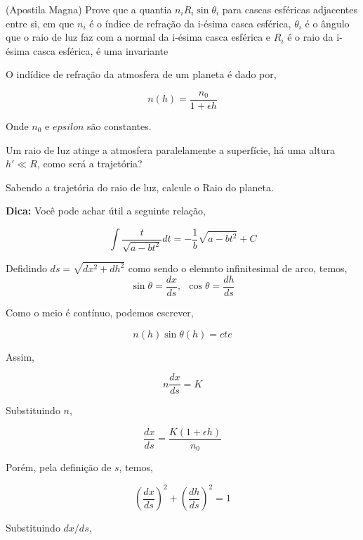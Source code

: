 \documentclass[11pt]{article}
\begin{document}
\begin{pproblem} (Apostila Magna)
    Prove que a quantia \(n_iR_i\sin \theta_i\) para cascas esféricas adjacentes entre si, em que \(n_i\) é o índice de refração da i-ésima casca esférica, \(\theta_i\) é o ângulo que o raio de luz faz com a normal da i-ésima casca esférica e \(R_i\) é o raio da i-ésima casca esférica, é uma invariante
    
\end{pproblem}

\begin{pproblem}
    O indídice de refração da atmosfera de um planeta é dado por, 

    \[n(h) = \frac{n_0}{1+\epsilon h}\]

    Onde \(n_0\) e \(epsilon\) são constantes.

    \begin{alternativas}
        \item Um raio de luz atinge a atmosfera paralelamente a superfície, há uma altura \(h'\ll R\), como será a trajetória?
        \item Sabendo a trajetória do raio de luz, calcule o Raio do planeta.
    
        \textbf{Dica:} Você pode achar útil a seguinte relação, 

        \[\int \frac{t}{\sqrt{a-bt^2}}dt = -\frac{1}{b}\sqrt{a-bt^2}+C\]
    \end{alternativas}
\begin{pssolution*}{}{}
    \begin{alternativas}
        \item Defidindo \(ds = \sqrt{dx^2+dh^2}\) como sendo o elemnto infinitesimal de arco, temos, 
        \[\sin\theta = \frac{dx}{ds}, \ \ \cos\theta = \frac{dh}{ds}\]

        Como o meio é contínuo, podemos escrever, 

        \[n(h)\sin\theta(h)=cte\]

        Assim, 

        \[n\frac{dx}{ds} = K\]

        Substituindo \(n\), 

        \[\frac{dx}{ds} = \frac{K(1+\epsilon h)}{n_0}\]

        Porém, pela definição de \(s\), temos, 

        \[\left(\frac{dx}{ds}\right)^2 + \left(\frac{dh}{ds}\right)^2 = 1\]

        Substituindo \(dx/ds\), 


\end{alternativas}
\end{pssolution*}
\end{pproblem}
\end{document}
